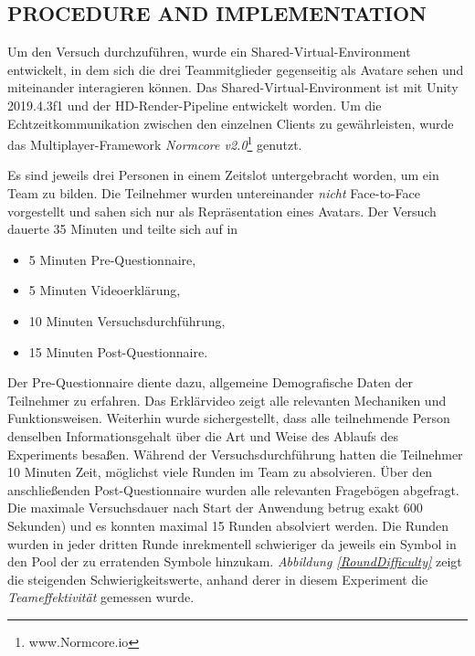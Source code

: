 \documentclass[sigchi]{acmart}
\begin{document}
\subsection{PROCEDURE AND IMPLEMENTATION}
Um den Versuch durchzuführen, wurde ein Shared-Virtual-Environment entwickelt, in dem sich die drei Teammitglieder gegenseitig als Avatare sehen und miteinander interagieren können. Das Shared-Virtual-Environment ist mit Unity 2019.4.3f1 und der HD-Render-Pipeline entwickelt worden. Um die Echtzeitkommunikation zwischen den einzelnen Clients zu gewährleisten, wurde das Multiplayer-Framework \textit{Normcore v2.0}\footnote{www.Normcore.io} genutzt.

Es sind jeweils drei Personen in einem Zeitslot untergebracht worden, um ein Team zu bilden. Die Teilnehmer wurden untereinander \textit{nicht} Face-to-Face vorgestellt und sahen sich nur als Repräsentation eines Avatars.
Der Versuch dauerte 35 Minuten und teilte sich auf in
		\begin{itemize}
			\item 5 Minuten Pre-Questionnaire,
			\item 5 Minuten Videoerklärung,
			\item 10 Minuten Versuchsdurchführung,
			\item 15 Minuten Post-Questionnaire.
		\end{itemize}
Der Pre-Questionnaire diente dazu, allgemeine Demografische Daten der Teilnehmer zu erfahren. Das Erklärvideo zeigt alle relevanten Mechaniken und Funktionsweisen. Weiterhin wurde sichergestellt, dass alle teilnehmende Person denselben Informationsgehalt über die Art und Weise des Ablaufs des Experiments besaßen. Während der Versuchsdurchführung hatten die Teilnehmer 10 Minuten Zeit, möglichst viele Runden im Team zu absolvieren. Über den anschließenden Post-Questionnaire wurden alle relevanten Fragebögen abgefragt. Die maximale Versuchsdauer nach Start der Anwendung betrug exakt 600 Sekunden) und es konnten maximal 15 Runden absolviert werden. Die Runden wurden in jeder dritten Runde inrekmentell schwieriger da jeweils ein Symbol in den Pool der zu erratenden Symbole hinzukam.
 \textit{Abbildung \ref{RoundDifficulty}} zeigt die steigenden Schwierigkeitswerte, anhand derer in diesem Experiment die \textit{Teameffektivität} gemessen wurde.
\end{document}
